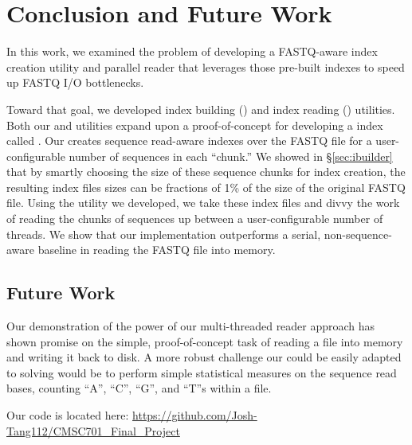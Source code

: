 \section{Conclusion and Future Work}

In this work, we examined the problem of developing a FASTQ-aware \gzip index
creation utility and parallel reader that leverages those pre-built indexes to
speed up \gzip FASTQ I/O bottlenecks. 

Toward that goal, we developed index building (\ibuilder) and index reading
(\ireader) utilities. Both our \ibuilder and \ireader utilities expand upon a
proof-of-concept for developing a \gzip index called \zran. Our \ibuilder
creates sequence read-aware indexes over the \gzip FASTQ file for a
user-configurable number of sequences in each ``chunk.'' We showed in
\S\ref{sec:ibuilder} that by smartly choosing the size of these sequence chunks
for index creation, the resulting index files sizes can be fractions of 1\% of
the size of the original \gzip FASTQ file. Using the \ireader utility we
developed, we take these index files and divvy the work of reading the chunks of
sequences up between a user-configurable number of threads. We show that our
implementation outperforms a serial, non-sequence-aware baseline in reading the
FASTQ file into memory. 

\subsection{Future Work}

Our demonstration of the power of our multi-threaded \gzip reader approach
has shown promise on the simple, proof-of-concept task of reading a \gzip file
into memory and writing it back to disk. A more robust challenge our \ireader
could be easily adapted to solving would be to perform simple statistical
measures on the sequence read bases, \eg counting ``A'', ``C'', ``G'', and
``T''s within a file.

Our code is located here:
\url{https://github.com/Josh-Tang112/CMSC701_Final_Project}

